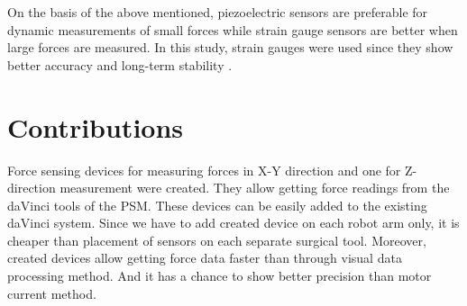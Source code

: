 On the basis of the above mentioned, piezoelectric sensors are preferable for dynamic measurements of small forces while strain gauge sensors are better when large forces are measured. In this study, strain gauges were used since they show better accuracy and long-term stability \cite{SGandP1,SGandP2}.

\section{Contributions}
\label{sec:MyAppr}
Force sensing devices for measuring forces in X-Y direction and one for Z-direction measurement were created. They allow getting force readings from the daVinci tools of the PSM.  These devices can be easily added to the existing daVinci system. Since we have to add created device on each robot arm only, it is cheaper than placement of sensors on each separate surgical tool.  Moreover, created devices allow getting force data faster than through visual data processing method. And it has a chance to show better precision than motor current method.
